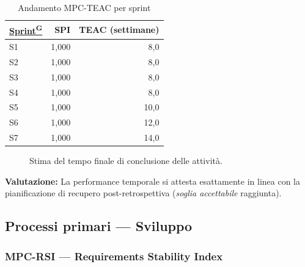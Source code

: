 \documentclass[a4paper,12pt]{article}
\providecommand{\glslink}[2]{\href{https://alittlebyte-19.github.io/Documentazione/glossario.html\#gls-#1}{\underline{#2}\textsuperscript{\scriptsize G}}}
\begin{document}
\begin{table}[H]
\centering
{}
\begin{tabular}{|l|r|r|}
    \hline
    \rowcolor{gray!35}
    \textbf{\glslink{sprint}{Sprint}} & \textbf{SPI} & \textbf{TEAC (settimane)} \\
    \hline
    S1 & 1,000 & 8,0 \\
    S2 & 1,000 & 8,0 \\
    S3 & 1,000 & 8,0 \\
    S4 & 1,000 & 8,0 \\
    S5 & 1,000 & 10,0 \\
    S6 & 1,000 & 12,0 \\
    S7 & 1,000 & 14,0 \\
    \hline
\end{tabular}
\caption{Andamento MPC-TEAC per sprint}
\end{table}

\begin{figure}[H]
\centering
{}
\caption{Stima del tempo finale di conclusione delle attività.}
\end{figure}

\noindent\textbf{Valutazione:} La performance temporale si attesta esattamente in linea con la pianificazione di recupero post-retrospettiva (\emph{soglia accettabile} raggiunta).

\subsection{Processi primari — Sviluppo}

\subsubsection{MPC-RSI — Requirements Stability Index}
\end{document}
